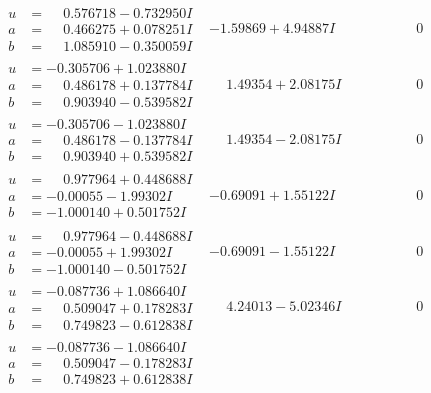 \documentclass[1p]{elsarticle_modified}
\theoremstyle{definition}
\begin{document}
$$\begin{array}{c|c|c}
\begin{aligned}
u &= \phantom{-}0.576718 - 0.732950 I \\
a &= \phantom{-}0.466275 + 0.078251 I \\
b &= \phantom{-}1.085910 - 0.350059 I\end{aligned}
 & -1.59869 + 4.94887 I & \phantom{-0.000000 } 0 \\ \hline\begin{aligned}
u &= -0.305706 + 1.023880 I \\
a &= \phantom{-}0.486178 + 0.137784 I \\
b &= \phantom{-}0.903940 - 0.539582 I\end{aligned}
 & \phantom{-}1.49354 + 2.08175 I & \phantom{-0.000000 } 0 \\ \hline\begin{aligned}
u &= -0.305706 - 1.023880 I \\
a &= \phantom{-}0.486178 - 0.137784 I \\
b &= \phantom{-}0.903940 + 0.539582 I\end{aligned}
 & \phantom{-}1.49354 - 2.08175 I & \phantom{-0.000000 } 0 \\ \hline\begin{aligned}
u &= \phantom{-}0.977964 + 0.448688 I \\
a &= -0.00055 - 1.99302 I \\
b &= -1.000140 + 0.501752 I\end{aligned}
 & -0.69091 + 1.55122 I & \phantom{-0.000000 } 0 \\ \hline\begin{aligned}
u &= \phantom{-}0.977964 - 0.448688 I \\
a &= -0.00055 + 1.99302 I \\
b &= -1.000140 - 0.501752 I\end{aligned}
 & -0.69091 - 1.55122 I & \phantom{-0.000000 } 0 \\ \hline\begin{aligned}
u &= -0.087736 + 1.086640 I \\
a &= \phantom{-}0.509047 + 0.178283 I \\
b &= \phantom{-}0.749823 - 0.612838 I\end{aligned}
 & \phantom{-}4.24013 - 5.02346 I & \phantom{-0.000000 } 0 \\ \hline\begin{aligned}
u &= -0.087736 - 1.086640 I \\
a &= \phantom{-}0.509047 - 0.178283 I \\
b &= \phantom{-}0.749823 + 0.612838 I\end{aligned}

\end{array}$$
\end{document}
